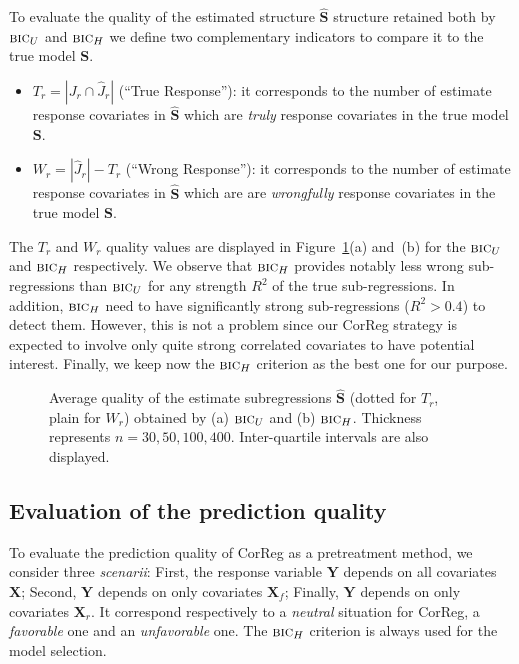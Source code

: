 \documentclass[11pt,a4paper]{article}
\begin{document}
To evaluate the quality of the estimated structure $\hat{\boldsymbol{S}}$ structure retained both by $\mbox{\sc bic}_U$ and $\mbox{\sc bic}_H$ we define two complementary indicators to compare it to the true model $\boldsymbol{S}$.
			\begin{itemize}
				\item $T_r=|J_r \cap \hat{J}_r|$ (``True Response''): it corresponds to the number of estimate response covariates in $\hat{\boldsymbol{S}}$ which are {\it truly} response covariates in the true model $\boldsymbol{S}$.
				\item $W_r=|\hat{J}_r|-T_r$ (``Wrong Response''): it corresponds to the number of estimate response covariates in $\hat{\boldsymbol{S}}$ which are are {\it wrongfully} response covariates in the true model $\boldsymbol{S}$.
			\end{itemize}
The $T_r$ and $W_r$ quality values are displayed in Figure~\ref{reshatZ}(a) and~(b) for the $\mbox{\sc bic}_U$ and $\mbox{\sc bic}_H$ respectively. We observe that $\mbox{\sc bic}_H$ provides notably less wrong sub-regressions than $\mbox{\sc bic}_U$ for any strength $R^2$ of the true sub-regressions. In addition, $\mbox{\sc bic}_H$ need to have significantly strong sub-regressions ($R^2>0.4$) to detect them. However, this is not a problem since our {\sc CorReg} strategy is expected to involve only quite strong correlated covariates to have potential interest. Finally, we keep now the $\mbox{\sc bic}_H$ criterion as the best one for our purpose.

\begin{figure}[h!]
	 \quad
	\caption{Average quality of the estimate subregressions $\hat{\boldsymbol{S}}$ (dotted for $T_r$, plain for $W_r$) obtained by (a) $\mbox{\sc bic}_U$ and (b) $\mbox{\sc bic}_H$. Thickness represents $n=30,50,100,400$. Inter-quartile intervals are also displayed.}\label{reshatZ}
\end{figure}



\FloatBarrier
\subsection{Evaluation of the prediction quality}\label{reshatY}

To evaluate the prediction quality of {\sc CorReg} as a pretreatment method, we consider three {\it scenarii}: First, the response variable $\boldsymbol{Y}$ depends on all covariates $\boldsymbol{X}$; Second, $\boldsymbol{Y}$ depends on only covariates $\boldsymbol{X}_f$; Finally, $\boldsymbol{Y}$ depends on only covariates $\boldsymbol{X}_r$. It correspond respectively to a {\it neutral} situation for {\sc CorReg}, a {\it favorable} one and an {\it unfavorable} one. %
The $\mbox{\sc bic}_H$ criterion is always used for the model selection.
\end{document}
